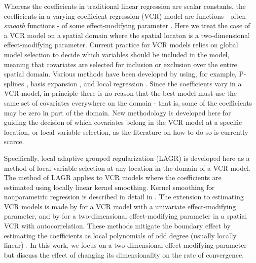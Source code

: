 \documentclass[authoryear,review, 12pt]{elsarticle}
\begin{document}
Whereas the coefficients in traditional linear regression are scalar
constants, the coefficients in a varying coefficient regression (VCR)
model are functions - often \emph{smooth} functions - of some effect-modifying
parameter \citep{Cleveland-Grosse-1991,Hastie-Tibshirani-1993}. Here
we treat the case of a VCR model on a spatial domain where the spatial
locaton is a two-dimensional effect-modifying parameter. Current practice
for VCR models relies on global model selection to decide which variables
should be included in the model, meaning that covariates are selected
for inclusion or exclusion over the entire spatial domain. Various
methods have been developed by using, for example, P-splines \citep{Antoniadis:2012a},
basis expansion \citep{Wang-2008a}, and local regression \citep{Wang-Xia-2009}.
Since the coefficients vary in a VCR model, in principle there is
no reason that the best model must use the same set of covariates
everywhere on the domain - that is, some of the coefficients may be
zero in part of the domain. New methodology is developed here for
guiding the decision of which covariates belong in the VCR model at
a specific location, or local variable selection, as the literature
on how to do so is currently scarce.

Specifically, local adaptive grouped regularization (LAGR) is developed
here as a method of local variable selection at any location in the
domain of a VCR model. The method of LAGR applies to VCR models where
the coefficients are estimated using locally linear kernel smoothing.
Kernel smoothing for nonparametric regression is described in detail
in \citet*{Fan-Gijbels-1996}. The extension to estimating VCR models
is made by \citet{Fan-Zhang-1999} for a VCR model with a univariate
effect-modifying parameter, and by \citet{Sun-Yan-Zhang-Lu-2014}
for a two-dimensional effect-modifying parameter in a spatial VCR
with autocorrelation. These methods mitigate the boundary effect by
estimating the coefficients as local polynomials of odd degree (usually
locally linear) \citep{Hastie:1993b}. In this work, we focus on a
two-dimensional effect-modifying parameter but discuss the effect
of changing its dimensionality on the rate of convergence.
\end{document}
